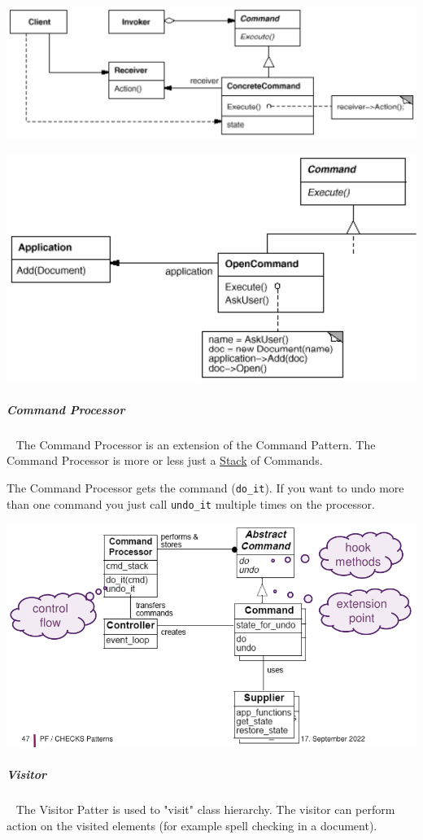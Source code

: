 \documentclass[11pt,twoside,landscape]{article}
\begin{document}
\begin{multicols}{3}
{
\begin{center}
\includegraphics[width=.9\linewidth]{img/command.png}
\end{center}
\label{fig:command-class-diagram}
}

{
\begin{center}
\includegraphics[width=.9\linewidth]{img/example_of_command.png}
\end{center}
\label{fig:example-of-command-pattern}
}
\subparagraph{Command Processor} \
\label{sec:org297fabd}
The Command Processor is an extension of the Command Pattern.
The Command Processor is more or less just a \href{../../../roam/20210806220134-stack.org}{Stack} of Commands.

The Command Processor gets the command (\texttt{do\_it}).
If you want to undo more than one command you just call \texttt{undo\_it} multiple times on the processor.


{
\begin{center}
\includegraphics[width=.9\linewidth]{img/command_processor.png}
\end{center}
\label{fig:command-processor}
}
\subparagraph{Visitor} \
\label{sec:org06eda8d}
The Visitor Patter is used to "visit" class hierarchy.
The visitor can perform action on the visited elements (for example spell checking in a document).


\end{multicols}
\end{document}
